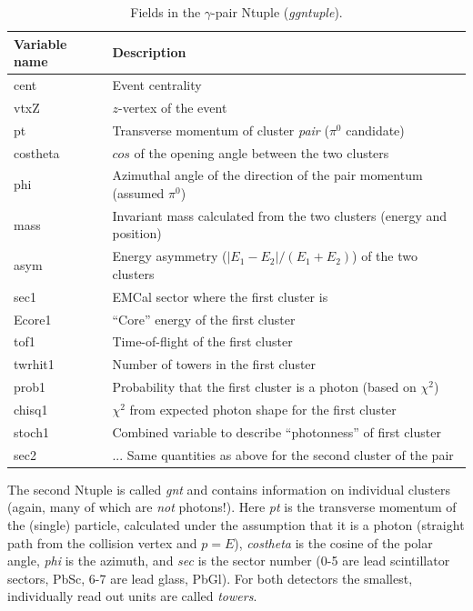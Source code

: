 \documentclass[12pt,letterpaper,aps,prc,superscriptaddress,showpacs,
longbibliography,nofootinbib,floatfix,onecolumn]{revtex4-1}
\begin{document}
\begin{table}[h]
  \begin{tabular}{|l|l|} \hline
    Variable name & Description \\ \hline
    cent & Event centrality \\
    vtxZ & $z$-vertex of the event \\
    pt   & Transverse momentum of cluster {\it pair} ($\pi^0$
    candidate) \\
    costheta & $cos$ of the opening angle between the two clusters \\    
    phi & Azimuthal angle of the direction of the pair momentum
    (assumed $\pi^0$) \\
    mass & Invariant mass calculated from the two clusters (energy and
    position) \\
    asym & Energy asymmetry ($|E_1-E_2|/(E_1+E_2)$) of the two clusters \\
    sec1 & EMCal sector where the first cluster is \\
    Ecore1 & ``Core'' energy of the first cluster \\
    tof1   & Time-of-flight of the first cluster \\
    twrhit1 & Number of towers in the first cluster \\
    prob1 & Probability that the first cluster is a photon (based on
    $\chi^2$) \\
    chisq1 & $\chi^2$ from expected photon shape for the first cluster
    \\
    stoch1 & Combined variable to describe ``photonness'' of first
    cluster \\
    sec2 & ...  Same quantities as above for the second cluster of the
    pair \\ \hline
  \end{tabular}
  \vspace{0.3cm}
  \caption{Fields in the $\gamma$-pair Ntuple ({\it ggntuple}).
}
  \label{tab:ggntuple}
 \end{table}

\vspace{0.05in}
\noindent
The second Ntuple is called {\it gnt} and contains information on
individual clusters (again, many of which are {\it not} photons!).
Here {\it pt} is the transverse momentum of the (single) particle,
calculated under the assumption that it is a photon (straight path
from the collision vertex and $p=E$), {\it costheta} is the cosine of
the polar angle, {\it phi} is the azimuth, and {\it sec} is the sector
number (0-5 are lead scintillator sectors, PbSc, 6-7 are lead glass,
PbGl).  For both detectors the smallest, individually read out units
are called {\it towers}.
\end{document}

